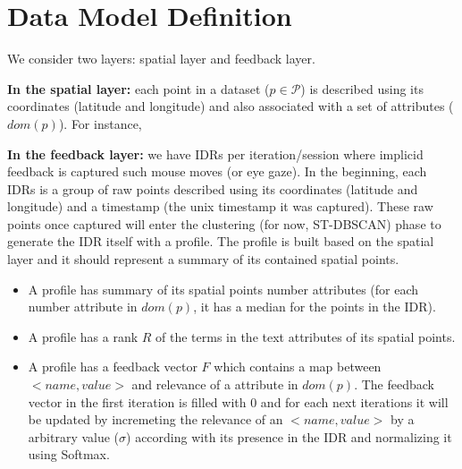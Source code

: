 \chapter{Data Model Definition}
\label{chap:model}

We consider two layers: spatial layer and feedback layer.

{\bf In the spatial layer:} each point in a dataset ($p \in \mathcal{P}$) is described using its coordinates (latitude and longitude) and also associated with a set of attributes ($dom(p)$). For instance, %

{\bf In the feedback layer:} we have IDRs per iteration/session where implicid feedback is captured such mouse moves (or eye gaze). In the beginning, each IDRs is a group of raw points described using its coordinates (latitude and longitude) and a timestamp (the unix timestamp it was captured). These raw points once captured will enter the clustering (for now, ST-DBSCAN) phase to generate the IDR itself with a profile. The profile is built based on the spatial layer and it should represent a summary of its contained spatial points. 

\begin{itemize}
\item A profile has summary of its spatial points number attributes (for each number attribute in $dom(p)$, it has a median for the points in the IDR).

\item A profile has a rank $R$ of the terms in the text attributes of its spatial points. %

\item A profile has a feedback vector $F$ which contains a map between $<name, value>$ and relevance of a attribute in $dom(p)$. The feedback vector in the first iteration is filled with 0 and for each next iterations it will be updated by incremeting the relevance of an $<name, value>$ by a arbitrary value ($\sigma$) according with its presence in the IDR and normalizing it using Softmax. %
\end{itemize}
